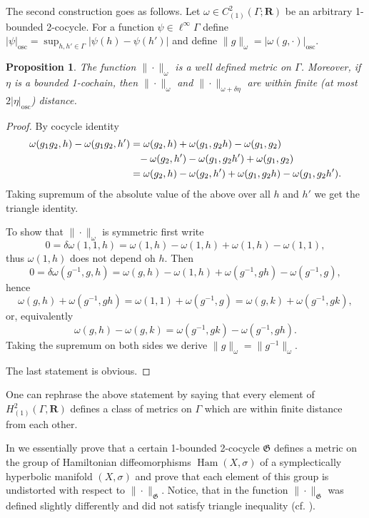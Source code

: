 \documentclass[12pt,reqno,a4paper]{amsart}
\newtheorem{proposition}[subsection]{Proposition}
\theoremstyle{definition}
\theoremstyle{remark}
\numberwithin{equation}{section}
\numberwithin{figure}{section}
\newcommand{\B}[1]{{\mathbf #1}}
\newcommand{\F}[1]{{\mathfrak #1}}
\newcommand{\R}{\mathrm}
\begin{document}
The second construction goes as follows.
Let $\omega\in C^2_{(1)}(\Gamma;\B R)$ 
be an arbitrary 1-bounded 2-cocycle.  For a function $\psi\in\ell^\infty\Gamma$
define $|\psi|_\R{osc}=\sup_{h,h'\in\Gamma}|\psi(h)-\psi(h')|$ and define $\|g\|_\omega=|\omega(g,\cdot)|_\R{osc}$.

\begin{proposition}
The function $\|\cdot\|_\omega$ is a well defined metric on $\Gamma$.  Moreover, if $\eta$ is a bounded 1-cochain,
then $\|\cdot\|_\omega$ and $\|\cdot\|_{\omega+\delta\eta}$ are within finite (at most $2|\eta|_\R{osc}$) distance.
\end{proposition}

\begin{proof}
By cocycle identity
\begin{align*}
\omega(g_1g_2,h)-\omega(g_1g_2,h')
&=\omega(g_2,h)+\omega(g_1,g_2h)-\omega(g_1,g_2)\\
&\hphantom{=}-\omega(g_2,h')-\omega(g_1,g_2h')+\omega(g_1,g_2)\\
&=\omega(g_2,h)-\omega(g_2,h')+\omega(g_1,g_2h)-\omega(g_1,g_2h').
\end{align*}
Taking supremum of the absolute value of the above over all $h$ and $h'$ we get
the triangle identity.

To show that $\|\cdot\|_\omega$ is symmetric first write
$$0=\delta\omega(1,1,h)=\omega(1,h)-\omega(1,h)+\omega(1,h)-\omega(1,1),$$
thus $\omega(1,h)$ does not depend oh $h$.  Then
$$0=\delta\omega(g^{-1},g,h)=\omega(g,h)-\omega(1,h)+\omega(g^{-1},gh)-\omega(g^{-1},g),$$
hence
$$\omega(g,h)+\omega(g^{-1},gh)=\omega(1,1)+\omega(g^{-1},g)=\omega(g,k)+\omega(g^{-1},gk),$$
or, equivalently
$$\omega(g,h)-\omega(g,k)=\omega(g^{-1},gk)-\omega(g^{-1},gh).$$
Taking the supremum on both sides we derive $\|g\|_\omega=\|g^{-1}\|_\omega$.

The last statement is obvious.
\end{proof}

One can rephrase the above statement by saying that every element of $H^2_{(1)}(\Gamma,\B R)$ defines
a class of metrics on $\Gamma$ which are within finite distance from each other.

In \cite[Theorem 5.2]{zbMATH06065373} we essentially prove that a certain
1-bounded 2-cocycle $\F G$ defines a metric on the group of Hamiltonian
diffeomorphisms $\operatorname{Ham}(X,\sigma)$ of a symplectically hyperbolic
manifold $(X,\sigma)$ and prove that each element of this group is undistorted
with respect to $\|\cdot\|_{\F G}$.  Notice, that in \cite{zbMATH06065373} the
function $\|\cdot\|_{\F G}$ was defined slightly differently and did not
satisfy triangle inequality (cf. \cite[Lemma 4.1]{zbMATH06065373}).
\end{document}
